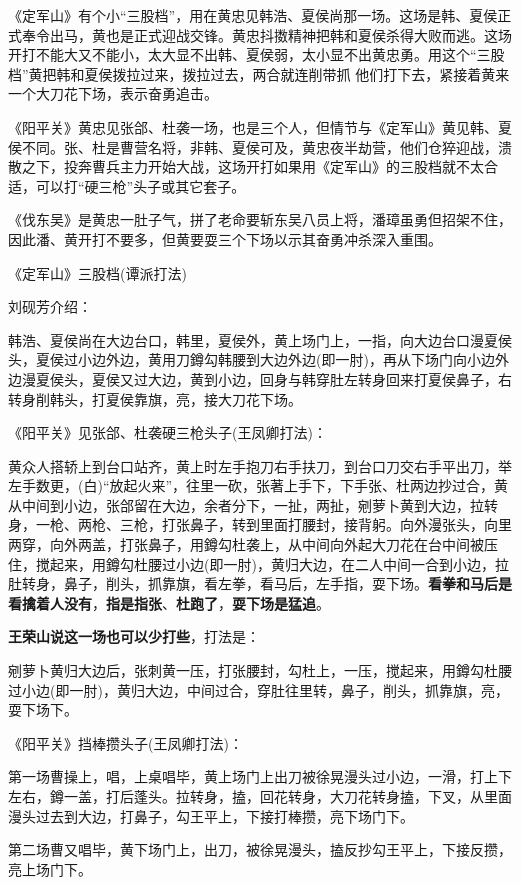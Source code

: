 《定军山》有个小``三股档''，用在黄忠见韩浩、夏侯尚那一场。这场是韩、夏侯正式奉令出马，黄也是正式迎战交锋。黄忠抖擞精神把韩和夏侯杀得大败而逃。这场开打不能大又不能小，太大显不出韩、夏侯弱，太小显不出黄忠勇。用这个``三股档''黄把韩和夏侯拨拉过来，拨拉过去，两合就连削带抓
他们打下去，紧接着黄来一个大刀花下场，表示奋勇追击。

《阳平关》黄忠见张郃、杜袭一场，也是三个人，但情节与《定军山》黄见韩、夏侯不同。张、杜是曹营名将，非韩、夏侯可及，黄忠夜半劫营，他们仓猝迎战，溃散之下，投奔曹兵主力开始大战，这场开打如果用《定军山》的三股档就不太合适，可以打``硬三枪''头子或其它套子。

《伐东吴》是黄忠一肚子气，拼了老命要斩东吴八员上将，潘璋虽勇但招架不住，因此潘、黄开打不要多，但黄要耍三个下场以示其奋勇冲杀深入重围。

《定军山》三股档(谭派打法)

刘砚芳介绍：

韩浩、夏侯尚在大边台口，韩里，夏侯外，黄上场门上，一指，向大边台口漫夏侯头，夏侯过小边外边，黄用刀鐏勾韩腰到大边外边(即一肘)，再从下场门向小边外边漫夏侯头，夏侯又过大边，黄到小边，回身与韩穿肚左转身回来打夏侯鼻子，右转身削韩头，打夏侯靠旗，亮，接大刀花下场。

《阳平关》见张郃、杜袭硬三枪头子(王凤卿打法)：

黄众人搭轿上到台口站齐，黄上时左手抱刀右手扶刀，到台口刀交右手平出刀，举左手数更，(白)``放起火来''，往里一砍，张著上手下，下手张、杜两边抄过合，黄从中间到小边，张郃留在大边，余者分下，一扯，两扯，剜萝卜黄到大边，拉转身，一枪、两枪、三枪，打张鼻子，转到里面打腰封，接背躬。向外漫张头，向里两穿，向外两盖，打张鼻子，用鐏勾杜袭上，从中间向外起大刀花在台中间被压住，搅起来，用鐏勾杜腰过小边(即一肘)，黄归大边，在二人中间一合到小边，拉肚转身，鼻子，削头，抓靠旗，看左拳，看马后，左手指，耍下场。\textbf{看拳和马后是看擒着人没有}，\textbf{指是指张}、\textbf{杜跑了}，\textbf{耍下场是猛追}。

\textbf{王荣山说这一场也可以少打些}，打法是：

剜萝卜黄归大边后，张刺黄一压，打张腰封，勾杜上，一压，搅起来，用鐏勾杜腰过小边(即一肘)，黄归大边，中间过合，穿肚往里转，鼻子，削头，抓靠旗，亮，耍下场下。

《阳平关》挡棒攒头子(王凤卿打法)：

第一场曹操上，唱，上桌唱毕，黄上场门上出刀被徐晃漫头过小边，一滑，打上下左右，鐏一盖，打后蓬头。拉转身，搕，回花转身，大刀花转身搕，下叉，从里面漫头过去到大边，打鼻子，勾王平上，下接打棒攒，亮下场门下。

第二场曹又唱毕，黄下场门上，出刀，被徐晃漫头，搕反抄勾王平上，下接反攒，亮上场门下。

